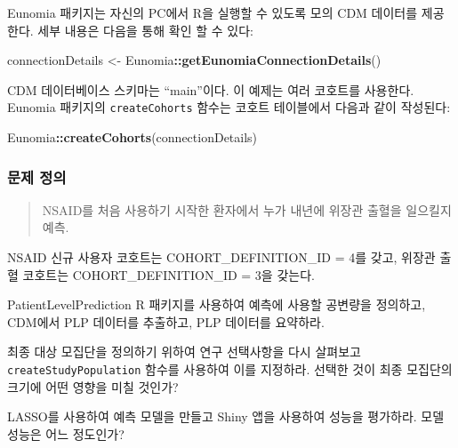 \documentclass[10.5pt]{book}
\newenvironment{Shaded}{\begin{snugshade}}{\end{snugshade}}
\newcommand{\KeywordTok}[1]{\textcolor[rgb]{0.13,0.29,0.53}{\textbf{#1}}}
\newcommand{\StringTok}[1]{\textcolor[rgb]{0.31,0.60,0.02}{#1}}
\newcommand{\OperatorTok}[1]{\textcolor[rgb]{0.81,0.36,0.00}{\textbf{#1}}}
\newcommand{\NormalTok}[1]{#1}
\theoremstyle{definition}
\theoremstyle{definition}
\theoremstyle{definition}
\theoremstyle{remark}
\let\BeginKnitrBlock\begin \let\EndKnitrBlock\end
\begin{document}
Eunomia 패키지는 자신의 PC에서 R을 실행할 수 있도록 모의 CDM 데이터를
제공한다. 세부 내용은 다음을 통해 확인 할 수 있다:

\begin{Shaded}
\begin{Highlighting}[]
\NormalTok{connectionDetails <-}\StringTok{ }\NormalTok{Eunomia}\OperatorTok{::}\KeywordTok{getEunomiaConnectionDetails}\NormalTok{()}
\end{Highlighting}
\end{Shaded}

CDM 데이터베이스 스키마는 ``main''이다. 이 예제는 여러 코호트를
사용한다. Eunomia 패키지의 \texttt{createCohorts} 함수는 코호트
테이블에서 다음과 같이 작성된다:

\begin{Shaded}
\begin{Highlighting}[]
\NormalTok{Eunomia}\OperatorTok{::}\KeywordTok{createCohorts}\NormalTok{(connectionDetails)}
\end{Highlighting}
\end{Shaded}

\subsubsection*{문제 정의}\label{--4}

\begin{quote}
NSAID를 처음 사용하기 시작한 환자에서 누가 내년에 위장관 출혈을 일으킬지
예측.
\end{quote}

NSAID 신규 사용자 코호트는 COHORT\_DEFINITION\_ID = 4를 갖고, 위장관
출혈 코호트는 COHORT\_DEFINITION\_ID = 3을 갖는다.

\BeginKnitrBlock{exercise}
\protect\hypertarget{exr:exercisePlp1}{}{\label{exr:exercisePlp1}
}PatientLevelPrediction R 패키지를 사용하여 예측에 사용할 공변량을
정의하고, CDM에서 PLP 데이터를 추출하고, PLP 데이터를 요약하라.
\EndKnitrBlock{exercise}

\BeginKnitrBlock{exercise}
\protect\hypertarget{exr:exercisePlp2}{}{\label{exr:exercisePlp2} }최종 대상
모집단을 정의하기 위하여 연구 선택사항을 다시 살펴보고
\texttt{createStudyPopulation} 함수를 사용하여 이를 지정하라. 선택한
것이 최종 모집단의 크기에 어떤 영향을 미칠 것인가?
\EndKnitrBlock{exercise}

\BeginKnitrBlock{exercise}
\protect\hypertarget{exr:exercisePlp3}{}{\label{exr:exercisePlp3} }LASSO를
사용하여 예측 모델을 만들고 Shiny 앱을 사용하여 성능을 평가하라. 모델
성능은 어느 정도인가?
\EndKnitrBlock{exercise}
\end{document}
